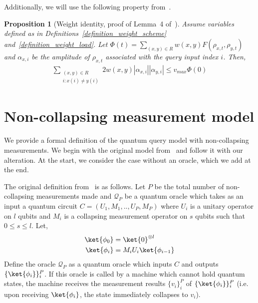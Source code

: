 \documentclass[10pt,a4paper]{article}
\newcommand{\abilityamount}[0]{\ensuremath{P}\xspace} %
\newcommand{\pdqporacle}[0]{\ensuremath{\mathcal{Q}_P}\xspace}
\newtheorem{proposition}[theorem]{Proposition}
\begin{document}
Additionally, we will use the following property from~\cite{weighted_adversary}.
\begin{proposition}[Weight identity, proof of Lemma~4 of~\cite{weighted_adversary}]\label{proposition_weight_identity}
    Assume variables defined as in Definitions~\ref{definition_weight_scheme} and~\ref{definition_weight_load}. Let $\Phi(t) = \sum_{(x,y)\in R} w(x,y) F(\rho_{x,t}, \rho_{y,t})$ and $\alpha_{x,i}$ be the amplitude of $\rho_{x,t}$ associated with the query input index $i$. Then,
    \begin{align*}
        \sum_{\substack{(x,y)\in R \\ i: x(i)\neq y(i)}} 2 w(x,y) \left|\alpha_{x,i} \right| \left|\alpha_{y,i}\right| \leq  v_{max}\Phi(0)
    \end{align*}
\end{proposition}

\section{Non-collapsing measurement model}\label{section_pdqp_model}

We provide a formal definition of the quantum query model with non-collapsing measurements. We begin with the original model from~\cite{space_above_bqp} and follow it with our alteration. At the start, we consider the case without an oracle, which we add at the end.

The original definition from~\cite{space_above_bqp} is as follows. Let \abilityamount be the total number of non-collapsing measurements made and \pdqporacle be a quantum oracle which takes as an input a quantum circuit $C=(U_1, M_1, .., U_{\abilityamount}, M_{\abilityamount})$ where $U_i$ is a unitary operator on $l$ qubits and $M_i$ is a collapsing measurement operator on $s$ qubits such that $0\leq s\leq l$. Let,
\begin{align*}
    \ket{\phi_0} &=\ket{0}^{\otimes l} \\
    \ket{\phi_{i}} &= M_iU_i\ket{\phi_{i-1}}\\
\end{align*}
Define the oracle \pdqporacle as a quantum oracle which inputs $C$ and outputs $\{\ket{\phi_i}\}_i^{\abilityamount}$. If this oracle is called by a machine which cannot hold quantum states, the machine receives the measurement results $\{v_i\}_i^{\abilityamount}$ of $\{\ket{\phi_i}\}_i^{\abilityamount}$ (i.e. upon receiving $\ket{\phi_i}$, the state immediately collapses to $v_i$).
\end{document}
